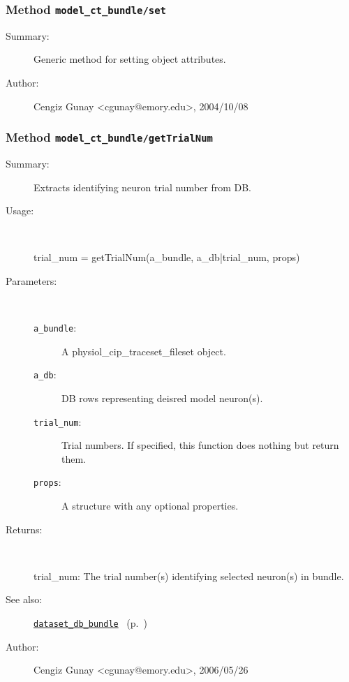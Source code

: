 \subsubsection[Method \texttt{set}]{Method \texttt{model\_ct\_bundle/set}}%
%
\label{ref_model_ct_bundle__set}%
\hypertarget{ref_model_ct_bundle__set}{}%
\begin{description}
\item[Summary:]Generic method for setting object attributes.
%
%
%
%
%
%
%
\item[Author:]%
Cengiz Gunay <cgunay@emory.edu>, 2004/10/08%
\end{description}
\methodline%
\subsubsection[Method \texttt{getTrialNum}]{Method \texttt{model\_ct\_bundle/getTrialNum}}%
%
\label{ref_model_ct_bundle__getTrialNum}%
\hypertarget{ref_model_ct_bundle__getTrialNum}{}%
\begin{description}
\item[Summary:]Extracts identifying neuron trial number from DB.
%
\item[Usage:]~%
\begin{lyxcode}%
trial\_num = getTrialNum(a\_bundle, a\_db|trial\_num, props)
%
\end{lyxcode}%
%
%
\item[Parameters:]~
\begin{description}%
\item[\texttt{a\_bundle}:]
 A physiol\_cip\_traceset\_fileset object.
\item[\texttt{a\_db}:]
 DB rows representing deisred model neuron(s).
\item[\texttt{trial\_num}:]
 Trial numbers. If specified, this function does nothing but return them.
\item[\texttt{props}:]
 A structure with any optional properties.
\end{description}%
%
\item[Returns:]~

	trial\_num: The trial number(s) identifying selected neuron(s) in bundle.
%
%
\item[See also:]%
\hyperlink{ref_dataset_db_bundle}{\texttt{dataset\_db\_bundle}}%
\ (p.~\pageref{ref_dataset_db_bundle})%
%
%
\item[Author:]%
Cengiz Gunay <cgunay@emory.edu>, 2006/05/26%
\end{description}
\methodline%
